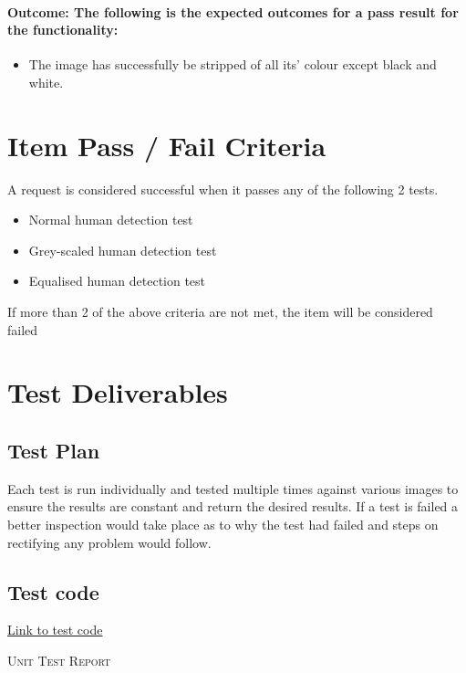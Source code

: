 \documentclass[a4paper,12pt]{report}
\begin{document}
	\paragraph{Outcome: The following is the expected outcomes for a pass result for the functionality:}
	\begin{itemize}
		\item The image has successfully be stripped of all its' colour except black and white.
	\end{itemize}
		
\section{Item Pass / Fail Criteria}
	A request is considered successful when it passes any of the following 2 tests.
	\begin {itemize}
		\item Normal human detection test
		\item Grey-scaled human detection test
		\item Equalised human detection test
	\end {itemize}
	If more than 2 of the above criteria are not met, the item will be considered failed
	
\section{Test Deliverables}
	\subsection {Test Plan}
		Each test is run individually and tested multiple times against various images to ensure the results are constant and return the desired results. If a test is failed a better inspection would take place as to why the test had failed and steps on rectifying any problem would follow.
		
	\subsection {Test code}
		\href{https://github.com/StephenSwanepoel/Ambitious-Designs/blob/master/Smart\%20Image\%20Identifier/src/test/com/codeferm/opencv/PeopleDetect\_Test.java}{Link to test code}  
	
\newpage
\begin{center}
	\textsc{\LARGE Unit Test Report}\\[1.5cm]
\end{center}
\end{document}
